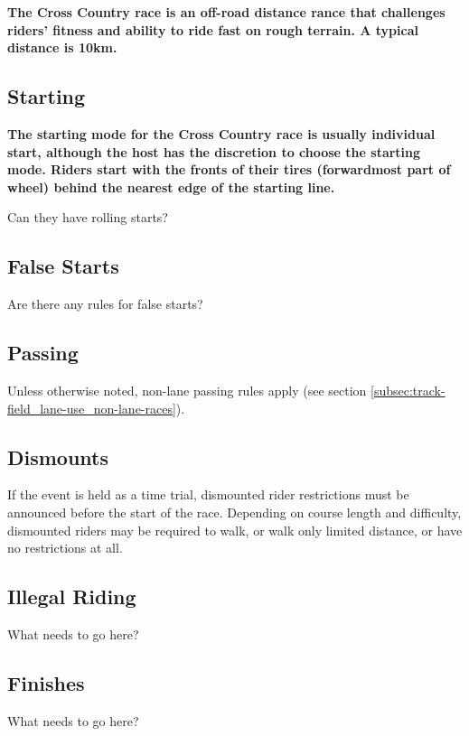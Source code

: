 \textbf{The Cross Country race is an off-road distance rance that challenges riders' fitness and ability to ride fast on rough terrain. A typical distance is 10km.}

\subsection{Starting}

\textbf{The starting mode for the Cross Country race is usually individual 
start, although the host has the discretion to choose the starting 
mode. Riders start with the fronts of their tires (forwardmost part of wheel) behind the nearest edge of the starting line.}

\begin{framed}
Can they have rolling starts?
\end{framed}

\subsection{False Starts}

\begin{framed}
Are there any rules for false starts?
\end{framed}

\subsection{Passing}

Unless otherwise noted, non-lane passing rules apply (see section \ref{subsec:track-field_lane-use_non-lane-races}).

\subsection{Dismounts}

If the event is held as a time trial, dismounted rider restrictions must be announced before the start of the race.
Depending on course length and difficulty, dismounted riders may be required to walk, or walk only limited distance, or have no restrictions at all.

\subsection{Illegal Riding}

\begin{framed}
What needs to go here?
\end{framed}

\subsection{Finishes}

\begin{framed}
What needs to go here?
\end{framed}

